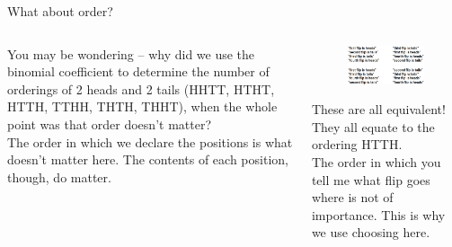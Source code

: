 \documentclass[aspectratio=169]{../latex_main/tntbeamer}  %
\begin{document}
	\begin{frame}{What about order?}
	    \begin{columns}
	        \begin{column}{.4\textwidth}
	            You may be wondering – why did we use the binomial coefficient to determine the number of orderings of 2 heads and 2 tails (HHTT, HTHT, HTTH, TTHH, THTH, THHT), when the whole point was that order doesn’t matter?\\
	            \bigskip
	            The order in which we declare the positions is what doesn’t matter here. The contents of each position, though, do matter. 
	        \end{column}
	        
	        \begin{column}{.5\textwidth}
	           \begin{figure}
	               \centering
	               \includegraphics[scale=.3]{Bild15}
	           \end{figure}
	           These are all equivalent! They all equate to the ordering HTTH.\\
	           
	           The order in which you tell me what flip goes where is not of importance. This is why we use choosing here.

	        \end{column}
	        
	    \end{columns}
	    
	\end{frame}
	
\end{document}
